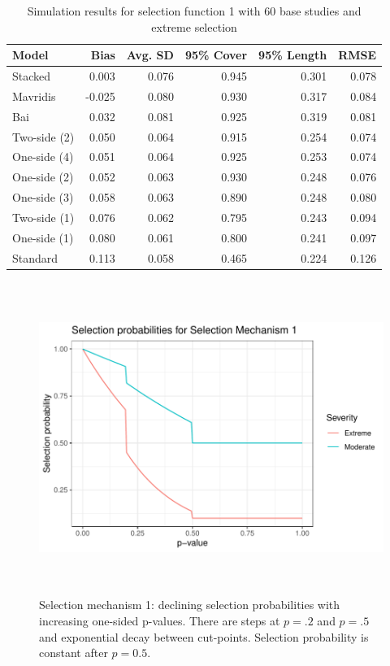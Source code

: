 \documentclass[12pt]{article}   	%
\numberwithin{equation}{section}
\begin{document}
\begin{table}[ht]
\centering
\begin{tabular}{lrrrrr}
  \hline
Model & Bias & Avg. SD & 95\% Cover & 95\% Length & RMSE \\ 
  \hline
Stacked & 0.003 & 0.076 & 0.945 & 0.301 & 0.078 \\ 
  Mavridis & -0.025 & 0.080 & 0.930 & 0.317 & 0.084 \\ 
  Bai & 0.032 & 0.081 & 0.925 & 0.319 & 0.081 \\ 
  Two-side (2) & 0.050 & 0.064 & 0.915 & 0.254 & 0.074 \\ 
  One-side (4) & 0.051 & 0.064 & 0.925 & 0.253 & 0.074 \\ 
  One-side (2) & 0.052 & 0.063 & 0.930 & 0.248 & 0.076 \\ 
  One-side (3) & 0.058 & 0.063 & 0.890 & 0.248 & 0.080 \\ 
  Two-side (1) & 0.076 & 0.062 & 0.795 & 0.243 & 0.094 \\ 
  One-side (1) & 0.080 & 0.061 & 0.800 & 0.241 & 0.097 \\ 
  Standard & 0.113 & 0.058 & 0.465 & 0.224 & 0.126 \\ 
   \hline
\end{tabular}
\caption{Simulation results for selection function 1 with 60 base studies and extreme selection}
\label{table:sim1_extreme_big_60}
\end{table}




\begin{figure}
\includegraphics[height = 4in, width = 6in]{SM1.pdf}
\caption{Selection mechanism 1: declining selection probabilities with increasing one-sided p-values. There are steps at $p = .2$ and $p=.5$ and exponential decay between cut-points. 
Selection probability is constant after $p=0.5$.}
\label{fig:SM1}
\end{figure}
\end{document}
